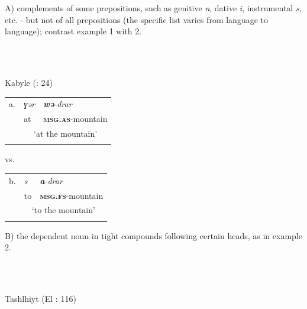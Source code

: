 \documentclass[output=paper]{langscibook}
\begin{document}
\begin{styleStandarduser}
A) complements of some prepositions, such as genitive \textit{n}, dative \textit{i}, instrumental \textit{s}, etc. - but not of all prepositions (the specific list varies from language to language); contrast example 1 with 2.
\end{styleStandarduser}

\begin{styleStandarduser}
\ea%
    \label{ex:key:1}
    \gll \\
         \\
    \glt
    \z %

          Kabyle (\citealt{MettouchiFrajzyngier2013}: 24)
\end{styleStandarduser}


\begin{tabularx}{\textwidth}{XXX}

\lsptoprule
a. & \textit{ɣər} & \textbf{\textit{wə}}\textit{{}-drar}\\
& at & \textbf{\textsc{msg.as}}{}-mountain\\
& \multicolumn{2}{c}{‘at the mountain’}\\
\lspbottomrule
\end{tabularx}
\begin{styleStandarduser}
vs.
\end{styleStandarduser}


\begin{tabularx}{\textwidth}{XXX}

\lsptoprule
b. & \textit{s} & \textbf{\textit{a}}\textit{{}-drar}\\
& to & \textbf{\textsc{msg.fs}}{}-mountain\\
& \multicolumn{2}{c}{‘to the mountain’}\\
\lspbottomrule
\end{tabularx}
\begin{styleStandarduser}
B) the dependent noun in tight compounds following certain heads, as in example 2.
\end{styleStandarduser}

\begin{styleStandarduser}
\ea%
    \label{ex:key:2}
    \gll \\
         \\
    \glt
    \z %

          Tashlhiyt (El \citealt{Moujahid1997}: 116)
\end{styleStandarduser}
\end{document}

